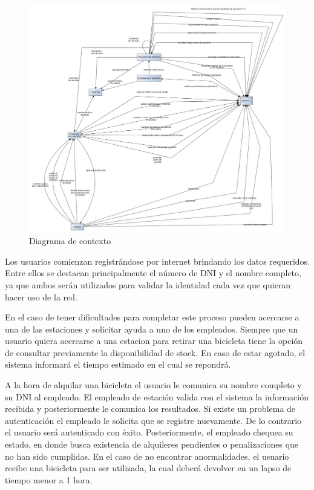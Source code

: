 \begin{figure}[H]
	\begin{center}
		  \includegraphics[scale=0.35]{diagrama_contexto.jpg}
		  \caption{Diagrama de contexto}
		  \label{fig:contra1}
	\end{center}
\end{figure}

Los usuarios comienzan registrándose por internet brindando los datos requeridos. Entre ellos se destacan principalmente el número de DNI y el nombre completo, ya que ambos serán utilizados
para validar la identidad cada vez que quieran hacer uso de la red. 

En el caso de tener dificultades para completar este proceso pueden acercarse a una de las estaciones y solicitar ayuda a uno de los empleados.
Siempre que un usuario quiera acercarse a una estacion para retirar una bicicleta tiene la opción de consultar previamente la disponibilidad de stock. En caso de estar agotado, el sistema informará el tiempo
estimado en el cual se repondrá.

A la hora de alquilar una bicicleta el usuario le comunica su nombre completo y su DNI al empleado. El empleado de estación valida con el sistema la información recibida y posteriormente le comunica
los resultados. Si existe un problema de autenticación el empleado le solicita que se registre nuevamente. De lo contrario el usuario será autenticado con éxito. Posteriormente, el empleado chequea 
su estado, en donde busca existencia de alquileres pendientes o penalizaciones que no han sido cumplidas. En el caso de no encontrar anormalidades, el usuario
recibe una bicicleta para ser utilizada, la cual deberá devolver en un lapso de tiempo menor a 1 hora.

